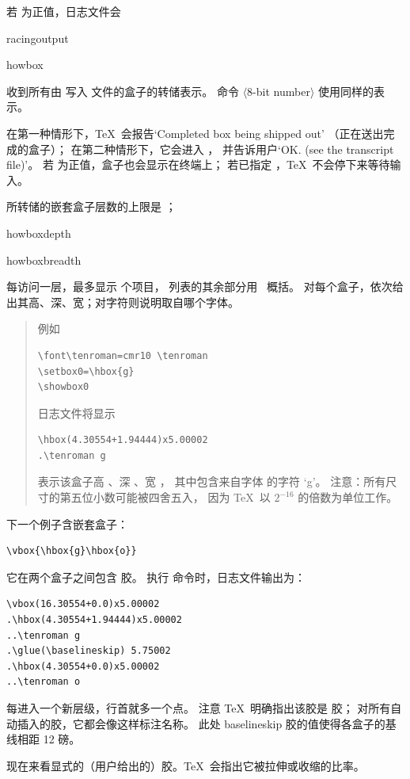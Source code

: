 \documentclass[a4paper]{rapport3}
\makeatletter
\def\gr#1{$\langle$#1$\rangle$}\def\key#1{{\tt#1}}
\newenvironment{example}{\begin{quotation}}{\end{quotation}}
\def\cstoidx#1\par{\index{#1@\cs{#1}}}
\makeatother
\begin{document}
若  为正值，日志文件会
\cstoidx tracingoutput\par\cstoidx showbox\par
收到所有由  写入  文件的盒子的转储表示。
命令 \gr{8-bit number} 使用同样的表示。

在第一种情形下，\TeX\ 会报告`Completed box being shipped out'
（正在送出完成的盒子）；
在第二种情形下，它会进入 ，
并告诉用户`OK. (see the transcript file)'。
若  为正值，盒子也会显示在终端上；
若已指定 ，\TeX\ 不会停下来等待输入。

所转储的嵌套盒子层数的上限是 ；
\cstoidx showboxdepth\par\cstoidx showboxbreadth\par
每访问一层，最多显示  个项目，
列表的其余部分用~ 概括。
对每个盒子，依次给出其高、深、宽；对字符则说明取自哪个字体。

\begin{example} 例如
\begin{verbatim}
\font\tenroman=cmr10 \tenroman
\setbox0=\hbox{g}
\showbox0
\end{verbatim} 
日志文件将显示
\begin{verbatim}
\hbox(4.30554+1.94444)x5.00002
.\tenroman g
\end{verbatim}
表示该盒子高 \n{4.30554pt}、深 \n{1.94444pt}、宽 \n{5.00002pt}，
其中包含来自字体  的字符 `g'。
注意：所有尺寸的第五位小数可能被四舍五入，
因为 \TeX\ 以 $2^{-16}$ 的倍数为单位工作。
\end{example}

下一个例子含嵌套盒子：
\begin{verbatim}
\vbox{\hbox{g}\hbox{o}}
\end{verbatim}
它在两个盒子之间包含  胶。
执行  命令时，日志文件输出为：
\begin{verbatim}
\vbox(16.30554+0.0)x5.00002
.\hbox(4.30554+1.94444)x5.00002
..\tenroman g
.\glue(\baselineskip) 5.75002
.\hbox(4.30554+0.0)x5.00002
..\tenroman o
\end{verbatim}
每进入一个新层级，行首就多一个点。
注意 \TeX\ 明确指出该胶是  胶；
对所有自动插入的胶，它都会像这样标注名称。
此处 baselineskip 胶的值使得各盒子的基线相距 12 磅。

现在来看显式的（用户给出的）胶。\TeX\ 会指出它被拉伸或收缩的比率。
\end{document}
